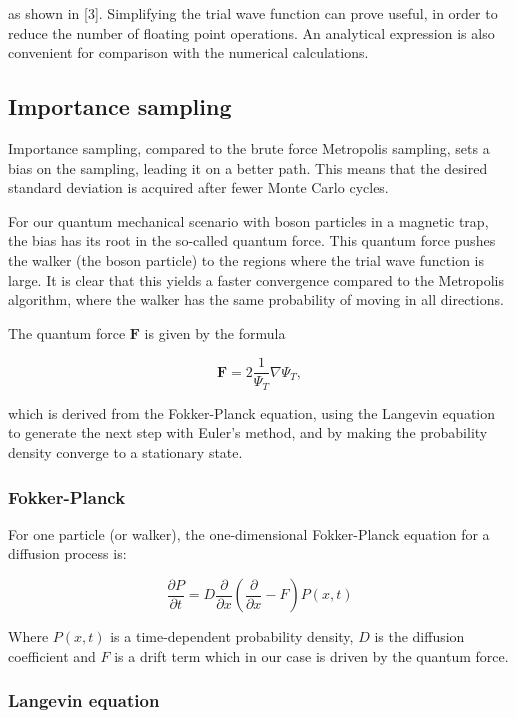 \documentclass[
]{article}
\begin{document}
as shown in {[}3{]}. Simplifying the trial wave function can prove
useful, in order to reduce the number of floating point operations. An
analytical expression is also convenient for comparison with the
numerical calculations.

\hypertarget{importance-sampling}{%
\subsection{Importance sampling}\label{importance-sampling}}

Importance sampling, compared to the brute force Metropolis sampling,
sets a bias on the sampling, leading it on a better path. This means
that the desired standard deviation is acquired after fewer Monte Carlo
cycles.

For our quantum mechanical scenario with boson particles in a magnetic
trap, the bias has its root in the so-called quantum force. This quantum
force pushes the walker (the boson particle) to the regions where the
trial wave function is large. It is clear that this yields a faster
convergence compared to the Metropolis algorithm, where the walker has
the same probability of moving in all directions.

The quantum force \(\mathbf{F}\) is given by the formula

\[ \mathbf{F}=2 \frac{1}{\Psi_{T}} \nabla \Psi_{T}, \]

which is derived from the Fokker-Planck equation, using the Langevin
equation to generate the next step with Euler's method, and by making
the probability density converge to a stationary state.

\hypertarget{fokker-planck}{%
\subsubsection{Fokker-Planck}\label{fokker-planck}}

For one particle (or walker), the one-dimensional Fokker-Planck equation
for a diffusion process is:

\[ \frac{\partial P}{\partial t}=D \frac{\partial}{\partial x}\left(\frac{\partial}{\partial x}-F\right) P(x, t) \]

Where \(P(x,t)\) is a time-dependent probability density, \(D\) is the
diffusion coefficient and \(F\) is a drift term which in our case is
driven by the quantum force.

\hypertarget{langevin-equation}{%
\subsubsection{Langevin equation}\label{langevin-equation}}
\end{document}
